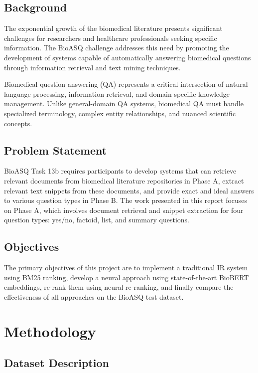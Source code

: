 \documentclass[12pt]{article}
\begin{document}
\subsection{Background}

The exponential growth of the biomedical literature presents significant challenges for researchers and healthcare professionals seeking specific information. The BioASQ challenge addresses this need by promoting the development of systems capable of automatically answering biomedical questions through information retrieval and text mining techniques.

Biomedical question answering (QA) represents a critical intersection of natural language processing, information retrieval, and domain-specific knowledge management. Unlike general-domain QA systems, biomedical QA must handle specialized terminology, complex entity relationships, and nuanced scientific concepts.

\subsection{Problem Statement}

BioASQ Task 13b requires participants to develop systems that can retrieve relevant documents from biomedical literature repositories in Phase A, extract relevant text snippets from these documents, and provide exact and ideal answers to various question types in Phase B. The work presented in this report focuses on Phase A, which involves document retrieval and snippet extraction for four question types: yes/no, factoid, list, and summary questions.

\subsection{Objectives}

The primary objectives of this project are to implement a traditional IR system using BM25 ranking, develop a neural approach using state-of-the-art BioBERT embeddings, re-rank them using neural re-ranking, and finally compare the effectiveness of all approaches on the BioASQ test dataset.

\section{Methodology}

\subsection{Dataset Description}
\end{document}
